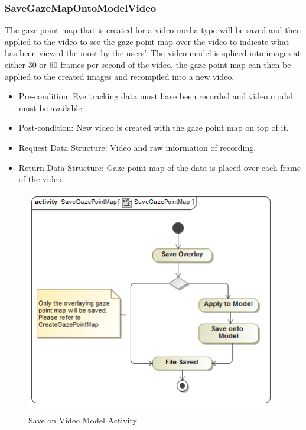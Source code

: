 	\subsubsection{SaveGazeMapOntoModelVideo}
	The gaze point map that is created for a video media type will be saved and then applied to the video to see the gaze point map over the video to indicate what has been viewed the most by the users'. The video model is spliced into images at either 30 or 60 frames per second of the video, the gaze point map can then be applied to the created images and recompiled into a new video.
	\begin{itemize}
		\item Pre-condition: Eye tracking data must have been recorded and video model must be available.
		\item Post-condition: New video is created with the gaze point map on top of it.
		\item Request Data Structure: Video and raw information of recording.
		\item Return Data Structure: Gaze point map of the data is placed over each frame of the video.
	\end{itemize}
	\begin{figure}[!ht]
		\centering	
		\includegraphics[scale=0.5,width=15cm,keepaspectratio]{Diagrams/Activity_Diagram__SaveGazePointMap__SaveGazePointMap.png}	
		\caption{Save on Video Model Activity}
	\end{figure}

